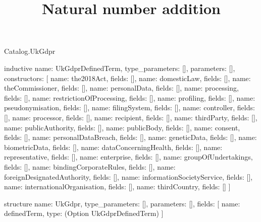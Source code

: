 \begin{lexlean}{Catalog.UkGdpr}
\title{Natural number addition}
\begin{semanticmodule}
inductive{
  name: UkGdprDefinedTerm,
  type_parameters: [],
  parameters: [],
  constructors: [
    {name: the2018Act, fields: []},
    {name: domesticLaw, fields: []},
    {name: theCommissioner, fields: []},
    {name: personalData, fields: []},
    {name: processing, fields: []},
    {name: restrictionOfProcessing, fields: []},
    {name: profiling, fields: []},
    {name: pseudonymisation, fields: []},
    {name: filingSystem, fields: []},
    {name: controller, fields: []},
    {name: processor, fields: []},
    {name: recipient, fields: []},
    {name: thirdParty, fields: []},
    {name: publicAuthority, fields: []},
    {name: publicBody, fields: []},
    {name: consent, fields: []},
    {name: personalDataBreach, fields: []},
    {name: geneticData, fields: []},
    {name: biometricData, fields: []},
    {name: dataConcerningHealth, fields: []},
    {name: representative, fields: []},
    {name: enterprise, fields: []},
    {name: groupOfUndertakings, fields: []},
    {name: bindingCorporateRules, fields: []},
    {name: foreignDesignatedAuthority, fields: []},
    {name: informationSocietyService, fields: []},
    {name: internationalOrganisation, fields: []},
    {name: thirdCountry, fields: []}
  ]
}

structure{
  name: UkGdpr,
  type_parameters: [],
  parameters: [],
  fields: [
    {name: definedTerm, type: (Option UkGdprDefinedTerm)}
  ]
}
\end{semanticmodule}
\end{lexlean}
